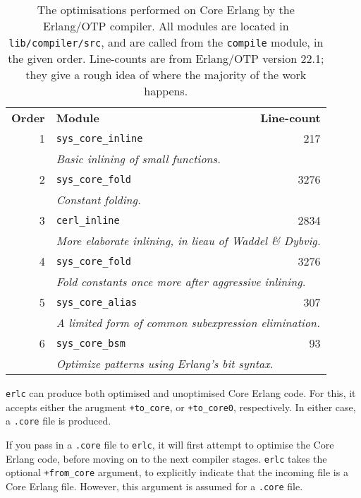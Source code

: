 \begin{table}[ht!]
\centering
\def\arraystretch{1.2}
\begin{tabular}{rlr}
\textbf{Order} & \textbf{Module} & \textbf{Line-count} \\\cline{2-3}
1 & \texttt{sys\_core\_inline} & 217 \\
  & \multicolumn{2}{l}{\quad\emph{%
      Basic inlining of small functions.%
    }} \\\cline{2-3}
2 & \texttt{sys\_core\_fold} & 3276 \\
  & \multicolumn{2}{l}{\quad\emph{%
      Constant folding.%
    }} \\\cline{2-3}
3 & \texttt{cerl\_inline} & 2834 \\
  & \multicolumn{2}{l}{\quad\emph{%
      More elaborate inlining, in lieau of Waddel \&
      Dybvig\cite{erlang:sas:1997:inlining}.%
    }} \\\cline{2-3}
4 & \texttt{sys\_core\_fold} & 3276 \\
  & \multicolumn{2}{l}{\quad\emph{%
      Fold constants once more after aggressive inlining.%
    }} \\\cline{2-3}
5 & \texttt{sys\_core\_alias} & 307 \\
  & \multicolumn{2}{l}{\quad\emph{%
      A limited form of common subexpression elimination.%
    }} \\\cline{2-3}
6 & \texttt{sys\_core\_bsm} & 93 \\
  & \multicolumn{2}{l}{\quad\emph{%
      Optimize patterns using Erlang's bit syntax.%
    }} \\\cline{2-3}
\end{tabular}
\caption{The optimisations performed on Core Erlang by the Erlang/OTP
compiler. All modules are located in \texttt{lib/compiler/src}, and
are called from the \texttt{compile} module, in the given order.
Line-counts are from Erlang/OTP version 22.1; they give  a rough idea
of where the majority of the work happens.}
\label{tbl:core-erlang-optimisations}
\end{table}

\texttt{erlc} can produce both optimised and unoptimised Core Erlang
code. For this, it accepts either the arugment \texttt{+to\_core}, or
\texttt{+to\_core0}, respectively. In either case, a \texttt{.core}
file is produced.

If you pass in a \texttt{.core} file to \texttt{erlc}, it will first
attempt to optimise the Core Erlang code, before moving on to the next
compiler stages. \texttt{erlc} takes the optional \texttt{+from\_core}
argument, to explicitly indicate that the incoming file is a Core
Erlang file. However, this argument is assumed for a \texttt{.core}
file.

